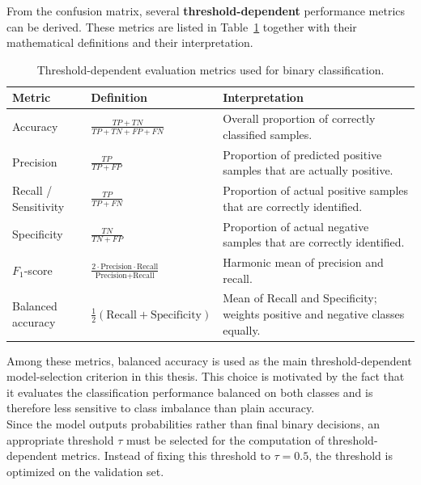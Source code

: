 From the confusion matrix, several \textbf{threshold-dependent} performance metrics can be derived. These metrics are listed in Table~\ref{tab:classification_metrics} together with their mathematical definitions and their interpretation.

\begin{table}[htbp]
\centering
\caption{Threshold-dependent evaluation metrics used for binary classification.}
\label{tab:classification_metrics}
\renewcommand{\arraystretch}{1.2}
\begin{tabular}{p{2.8cm} p{4.2cm} p{6.3cm}}
\toprule
\textbf{Metric} & \textbf{Definition} & \textbf{Interpretation} \\
\midrule
Accuracy &
\(
\displaystyle
\frac{TP+TN}{TP+TN+FP+FN}
\)
&
Overall proportion of correctly classified samples. \\[10pt]

Precision &
\(
\displaystyle
\frac{TP}{TP+FP}
\)
&
Proportion of predicted positive samples that are actually positive. \\[10pt]

Recall / Sensitivity &
\(
\displaystyle
\frac{TP}{TP+FN}
\)
&
Proportion of actual positive samples that are correctly identified. \\[10pt]

Specificity &
\(
\displaystyle
\frac{TN}{TN+FP}
\)
&
Proportion of actual negative samples that are correctly identified. \\[10pt]

\(F_1\)-score &
\(
\displaystyle
\frac{2 \cdot \text{Precision} \cdot \text{Recall}}
{\text{Precision} + \text{Recall}}
\)
&
Harmonic mean of precision and recall. \\[10pt]

Balanced accuracy &
\(
\displaystyle
\frac{1}{2}
\left( \text{Recall} + \text{Specificity} \right)
\)
&
Mean of Recall and Specificity; weights positive and negative classes equally. \\
\bottomrule
\end{tabular}
\end{table}

Among these metrics, balanced accuracy is used as the main threshold-dependent model-selection criterion in this thesis. This choice is motivated by the fact that it evaluates the classification performance balanced on both classes and is therefore less sensitive to class imbalance than plain accuracy.\\

Since the model outputs probabilities rather than final binary decisions, an appropriate threshold \(\tau\) must be selected for the computation of threshold-dependent metrics. Instead of fixing this threshold to \(\tau = 0.5\), the threshold is optimized on the validation set.

